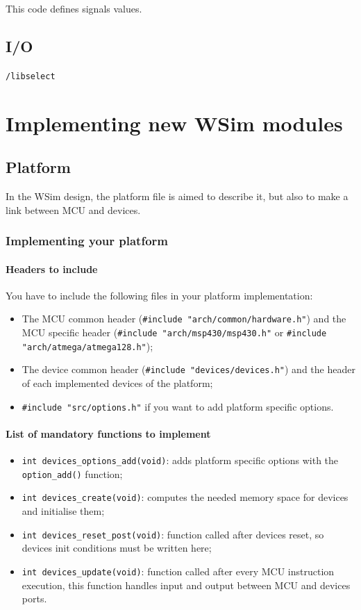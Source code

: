 \documentclass[a4paper,10pt]{report}
\begin{document}
This code defines signals values.

\section{I/O}
\verb$/libselect$


\chapter{Implementing new WSim modules}

\section{Platform}
In the WSim design, the platform file is aimed to describe it, but also to make a link between MCU and devices.
\subsection{Implementing your platform}
\subsubsection{Headers to include}
You have to include the following files in your platform implementation:
\begin{itemize}
  \item The MCU common header (\verb$#include "arch/common/hardware.h"$) and the MCU specific header (\verb$#include "arch/msp430/msp430.h"$ or \verb$#include "arch/atmega/atmega128.h"$);
  \item The device common header (\verb$#include "devices/devices.h"$) and the header of each implemented devices of the platform;
  \item \verb$#include "src/options.h"$ if you want to add platform specific options.
\end{itemize}

\subsubsection{List of mandatory functions to implement}
\begin{itemize}
  \item \verb$int devices_options_add(void)$: adds platform specific options with the \verb$option_add()$ function;
  \item \verb$int devices_create(void)$: computes the needed memory space for devices and initialise them;
  \item \verb$int devices_reset_post(void)$: function called after devices reset, so devices init conditions must be written here;	
  \item \verb$int devices_update(void)$: function called after every MCU instruction execution, this function handles input and output between MCU and devices ports.
\end{itemize}
\end{document}
